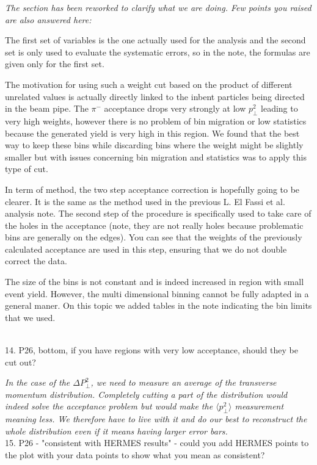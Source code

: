 \documentclass[12pt]{article}
\begin{document}
{ \it The section has been reworked to clarify what we are doing. Few points you raised 
are also answered here:

The first set of variables is the one actually used for the
analysis and the second set is only used to evaluate the systematic errors, so in the 
note, the formulas are given only for the first set.

The motivation for using such a weight cut based on the product of different unrelated
values is actually directly linked to the inbent 
particles being directed in the beam pipe. The $\pi^-$ acceptance drops very 
strongly at low $p_\perp^2$ leading to very high weights, however there is no problem of 
bin migration
or low statistics because the generated yield is very high in this region. We found that 
the best way
to keep these bins while discarding bins where the weight might be slightly smaller but with 
issues concerning bin migration and statistics was to apply this type of cut.

In term of method, the two
step acceptance correction is hopefully going to be clearer. It is the same as the method used 
in the previous L. El Fassi et al. analysis note. The second step of the procedure is
specifically used to take care of the holes in the acceptance (note, they are not really 
holes because problematic bins are generally on the edges). You can see that the weights
of the previously calculated acceptance are used in this step, ensuring that we do not
double correct the data.

The size of the bins is not constant and is indeed increased in region with small event yield.
However, the multi dimensional binning cannot be fully adapted in a general maner. On this
topic we added tables in the note indicating the bin limits that we used.} \\


14.
P26, bottom, if you have regions with very low acceptance, should they be cut out?

{\it In the case of the $\Delta P_\perp^2$, we need to measure an average of the
transverse momentum distribution. Completely cutting a part of the distribution
would indeed solve the acceptance problem but would make the $\langle p_\perp^2 \rangle$
measurement meaning less. We therefore have to live with it and do our best to
reconstruct the whole distribution even if it means having larger error bars.} \\


15.
P26 - "consistent with HERMES results" - could you add HERMES points to the plot with 
your data points to show what you mean as consistent?
\end{document}
